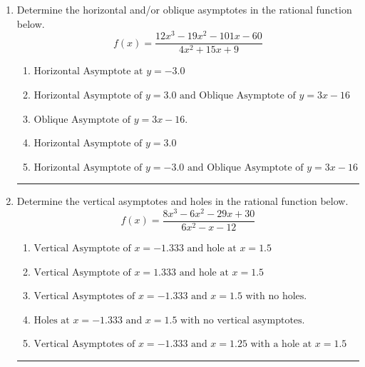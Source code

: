\documentclass[14pt]{extbook}
\newcommand{\litem}[1]{\item#1\hspace*{-1cm}\rule{\textwidth}{0.4pt}}
\begin{document}
\begin{enumerate}
\litem{
Determine the horizontal and/or oblique asymptotes in the rational function below.\[ f(x) = \frac{12x^{3} -19 x^{2} -101 x -60}{4x^{2} +15 x + 9} \]\begin{enumerate}[label=\Alph*.]
\item \( \text{Horizontal Asymptote at } y = -3.0 \)
\item \( \text{Horizontal Asymptote of } y = 3.0 \text{ and Oblique Asymptote of } y = 3x -16 \)
\item \( \text{Oblique Asymptote of } y = 3x -16. \)
\item \( \text{Horizontal Asymptote of } y = 3.0  \)
\item \( \text{Horizontal Asymptote of } y = -3.0 \text{ and Oblique Asymptote of } y = 3x -16 \)

\end{enumerate} }
\litem{
Determine the vertical asymptotes and holes in the rational function below.\[ f(x) = \frac{8x^{3} -6 x^{2} -29 x + 30}{6x^{2} -x -12} \]\begin{enumerate}[label=\Alph*.]
\item \( \text{Vertical Asymptote of } x = -1.333 \text{ and hole at } x = 1.5 \)
\item \( \text{Vertical Asymptote of } x = 1.333 \text{ and hole at } x = 1.5 \)
\item \( \text{Vertical Asymptotes of } x = -1.333 \text{ and } x = 1.5 \text{ with no holes.} \)
\item \( \text{Holes at } x = -1.333 \text{ and } x = 1.5 \text{ with no vertical asymptotes.} \)
\item \( \text{Vertical Asymptotes of } x = -1.333 \text{ and } x = 1.25 \text{ with a hole at } x = 1.5 \)


\end{enumerate}}
\end{enumerate}
\end{document}
